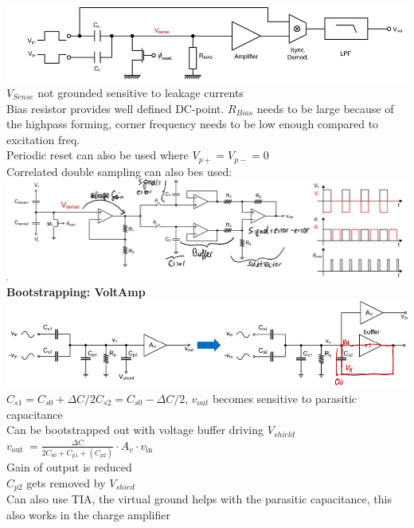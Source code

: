 \documentclass[5pt]{article}
\begin{document}
\begin{multicols*}{4}
\includegraphics[width=\columnwidth]{images/dc_pot_capa.png}\\
$ V_{Sense} $ not grounded sensitive to leakage currents\\
Bias resistor provides well defined DC-point. $ R_{Bias} $ needs to be large because of the highpass forming, corner frequency needs to be low enough compared to excitation freq. \\
Periodic reset can also be used where $ V_{p+} = V_{p-} =0  $\\
Correlated double sampling can also bes used:\\
\includegraphics[width=\columnwidth]{images/corr_double_sample.png}\\
\textbf{Bootstrapping: VoltAmp}\\
\includegraphics[width=\columnwidth]{images/bootstrapping.png}\\
$ C_{s 1}=C_{s 0}+\Delta C / 2 $$ C_{s 2}=C_{s 0}-\Delta C / 2 $, $ v_{out} $ becomes sensitive to parasitic capacitance\\
Can be bootstrapped out with voltage buffer driving $ V_{shield} $\\
$ v_{\text {out }}=\frac{\Delta C}{2 C_{\mathrm{s} 0}+C_{\mathrm{p} 1} +(C_{p2})} \cdot A_{v} \cdot v_{\text {in }} $ \\
Gain of output is reduced\\
 $C_{p2} $ gets removed by $V_{shied} $\\
Can also use TIA, the virtual ground helps with the parasitic capacitance, this also works in the charge amplifier\\
$$
\end{multicols*}
\end{document}

